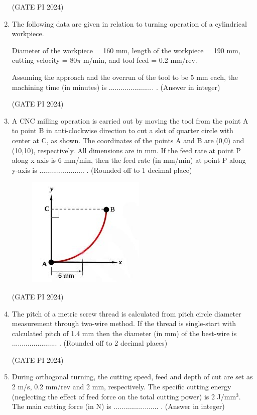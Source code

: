 \documentclass[journal,12pt,onecolumn]{IEEEtran}
\theoremstyle{remark}
\begin{document}
\begin{enumerate}
\hfill (GATE PI 2024)

\item The following data are given in relation to turning operation of a cylindrical workpiece.

Diameter of the workpiece = 160 mm, length of the workpiece = 190 mm, cutting velocity = $80\pi$ m/min, and tool feed = 0.2 mm/rev.

Assuming the approach and the overrun of the tool to be 5 mm each, the machining time (in minutes) is ....................... . (Answer in integer)

\hfill (GATE PI 2024)

\item A CNC milling operation is carried out by moving the tool from the point A to point B in anti-clockwise direction to cut a slot of quarter circle with center at C, as shown. The coordinates of the points A and B are (0,0) and (10,10), respectively. All dimensions are in mm. If the feed rate at point P along x-axis is 6 mm/min, then the feed rate (in mm/min) at point P along y-axis is ....................... . (Rounded off to 1 decimal place)

\begin{figure}[H]
\centering
\includegraphics[width=0.5\columnwidth]{fig12.png}
\caption{}
\end{figure}
\hfill (GATE PI 2024)

\item The pitch of a metric screw thread is calculated from pitch circle diameter measurement through two-wire method. If the thread is single-start with calculated pitch of 1.4 mm then the diameter (in mm) of the best-wire is ....................... . (Rounded off to 2 decimal places)

\hfill (GATE PI 2024)

\item During orthogonal turning, the cutting speed, feed and depth of cut are set as 2 m/s, 0.2 mm/rev and 2 mm, respectively. The specific cutting energy (neglecting the effect of feed force on the total cutting power) is 2 J/mm$^3$. The main cutting force (in N) is ....................... . (Answer in integer)


\end{enumerate}
\end{document}
